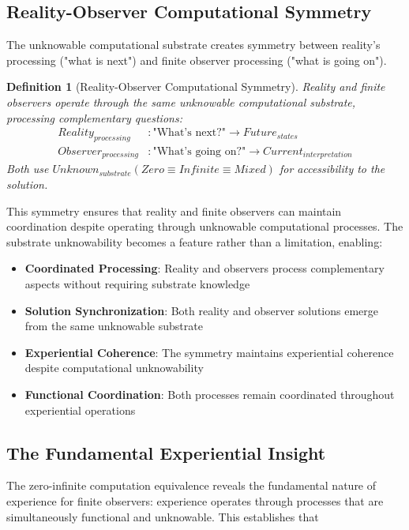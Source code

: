 \documentclass{article}
\newtheorem{definition}[theorem]{Definition}
\begin{document}
\subsection{Reality-Observer Computational Symmetry}

The unknowable computational substrate creates symmetry between reality's processing ("what is next") and finite observer processing ("what is going on").

\begin{definition}[Reality-Observer Computational Symmetry]
Reality and finite observers operate through the same unknowable computational substrate, processing complementary questions:
\begin{align}
Reality_{processing} &: \text{"What's next?"} \rightarrow Future_{states} \\
Observer_{processing} &: \text{"What's going on?"} \rightarrow Current_{interpretation}
\end{align}
Both use $Unknown_{substrate}(Zero \equiv Infinite \equiv Mixed)$ for accessibility to the solution.
\end{definition}

This symmetry ensures that reality and finite observers can maintain coordination despite operating through unknowable computational processes. The substrate unknowability becomes a feature rather than a limitation, enabling:

\begin{itemize}
\item \textbf{Coordinated Processing}: Reality and observers process complementary aspects without requiring substrate knowledge
\item \textbf{Solution Synchronization}: Both reality and observer solutions emerge from the same unknowable substrate
\item \textbf{Experiential Coherence}: The symmetry maintains experiential coherence despite computational unknowability
\item \textbf{Functional Coordination}: Both processes remain coordinated throughout experiential operations
\end{itemize}

\subsection{The Fundamental Experiential Insight}

The zero-infinite computation equivalence reveals the fundamental nature of experience for finite observers: experience operates through processes that are simultaneously functional and unknowable. This establishes that
\end{document}

